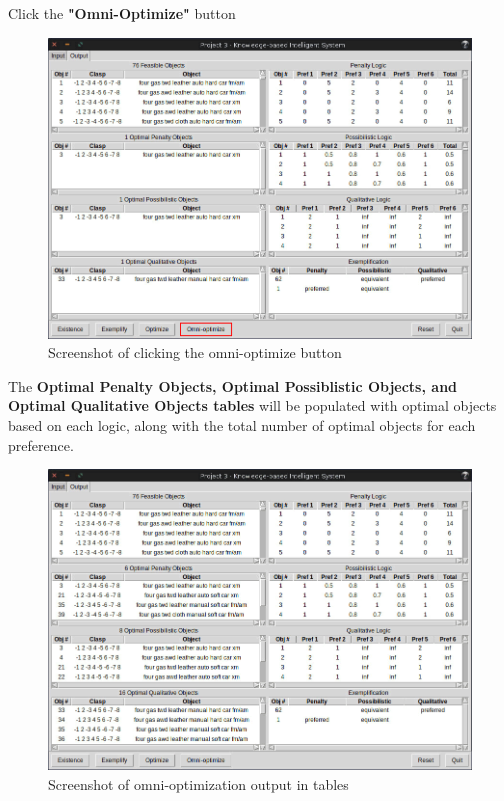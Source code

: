 \documentclass[12pt]{report}
\begin{document}
\begin{description}[leftmargin=4em]
\item [Step 1:]  Click the \textbf{"Omni-Optimize"} button
\begin{figure}[H]
\begin{center}
\includegraphics[scale=0.3,trim=1cm 1cm 1cm 1cm]{omni-optimize}
\caption{Screenshot of clicking the omni-optimize button}
\end{center}
\end{figure}
\vspace{-2.5em}
\item [Result:] The \textbf{Optimal Penalty Objects, Optimal Possiblistic Objects, and Optimal Qualitative Objects tables} will be populated with optimal objects based on each logic, along with the total number of optimal objects for each preference.
\begin{figure}[H]
\begin{center}
\includegraphics[scale=0.3,trim=1cm 1cm 1cm 1cm]{post_omni-optimize}
\caption{Screenshot of omni-optimization output in tables}
\end{center}
\end{figure}
\vspace{-2.5em}
\end{description}
\end{document}

